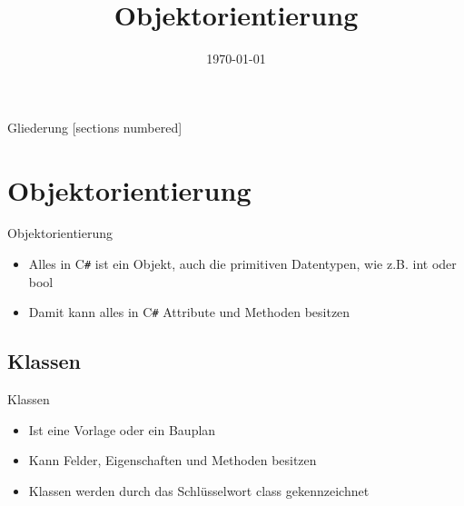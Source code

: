 



\title{Objektorientierung}
\date{\today}




\maketitle

\begin{frame}{Gliederung}
	[sections numbered]
	\tableofcontents
\end{frame}

\section{Objektorientierung}
\begin{frame}{Objektorientierung}
	\begin{itemize}
		\item Alles in C\texttt{\#} ist ein Objekt, auch die primitiven Datentypen, wie z.B. int oder bool
		\item Damit kann alles in C\texttt{\#} Attribute und Methoden besitzen		
	\end{itemize}
\end{frame}

\subsection{Klassen}
\begin{frame}{Klassen}
	\begin{itemize}
		\item Ist eine Vorlage oder ein Bauplan
		\item Kann Felder, Eigenschaften und Methoden besitzen
		\item Klassen werden durch das Schlüsselwort \alert{class} gekennzeichnet
	\end{itemize}	
	
\end{frame}


